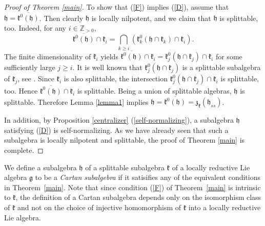 \documentclass{article}
\newcommand {\Z} {\mathbb{Z}}
\def\h{\mathfrak {h}}
\def\g{\mathfrak {g}}
\def\z{\mathfrak {z}}
\def\k{\mathfrak{k}}
\begin{document}
\begin{proof}[Proof of Theorem \ref{main}]
To show that (\ref{F}) implies (\ref{D}), assume that $\h = \overline{\k^0(\h)}$.  Then clearly $\h$ is locally nilpotent, and we claim that $\h$ is splittable, too.  Indeed, for any $i \in \Z_{>0}$, 
$$\overline{\k^0(\h)} \cap \k_i = \bigcap_{k \geq i} \left(\k_k^0(\h \cap \k_k) \cap \k_i \right).$$  The finite dimensionality of $\k_i$ yields $\overline{\k^0(\h)} \cap \k_i = \k_{j}^0(\h \cap \k_{j}) \cap \k_i$ for some sufficiently large $j \geq i$.  It is well known that $\k_j^0(\h \cap \k_j)$ is a splittable subalgebra of $\k_j$, see \cite[Ch. VII, \S 1, Prop. 11]{Bourbaki}.  Since $\k_i$ is also splittable, the intersection $\k_{j}^0(\h \cap \k_{j}) \cap \k_i$ is splittable, too.   Hence $\overline{\k^0(\h)} \cap \k_i$ is splittable.  Being a union of splittable algebras, $\h$ is splittable.  Therefore Lemma \ref{lemma1} implies $\h = \overline{\k^0(\h)} = \z_\k(\h_{ss})$.

In addition, by Proposition \ref{centralizer} (\ref{self-normalizing}), a subalgebra $\h$ satisfying (\ref{D}) is self-normalizing.  As we have already seen that such a subalgebra is locally nilpotent and splittable, the proof of Theorem \ref{main} is complete.
\end{proof}

We define a subalgebra $\h$ of a splittable subalgebra $\k$ of a locally reductive Lie algebra $\g$ to be a \emph{Cartan subalgebra} if it satisifies any of the equivalent conditions in Theorem~\ref{main}.  Note that since condition (\ref{F}) of Theorem~\ref{main} is intrinsic to $\k$, the definition of a Cartan subalgebra depends only on the isomorphism class of $\k$ and not on the choice of injective homomorphism of $\k$ into a locally reductive Lie algebra. 
\end{document}
